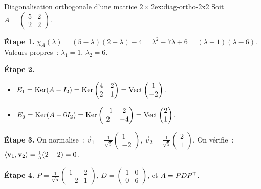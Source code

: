 \begin{example}{Diagonalisation orthogonale d'une matrice $2 \times 2$}{ex:diag-ortho-2x2}
  Soit $A = \begin{pmatrix} 5 & 2 \\ 2 & 2 \end{pmatrix}$.

  \textbf{Étape 1.} $\chi_A(\lambda) = (5-\lambda)(2-\lambda) - 4
  = \lambda^2 - 7\lambda + 6 = (\lambda - 1)(\lambda - 6)$.
  Valeurs propres~: $\lambda_1 = 1$, $\lambda_2 = 6$.

  \textbf{Étape 2.}
  \begin{itemize}
    \item $E_1 = \operatorname{Ker}(A - I_2) = \operatorname{Ker}\begin{pmatrix} 4 & 2 \\ 2 & 1
      \end{pmatrix} = \operatorname{Vect}\begin{pmatrix} 1 \\ -2 \end{pmatrix}$.
    \item $E_6 = \operatorname{Ker}(A - 6I_2) = \operatorname{Ker}\begin{pmatrix} -1 & 2 \\ 2 & -4
      \end{pmatrix} = \operatorname{Vect}\begin{pmatrix} 2 \\ 1 \end{pmatrix}$.
  \end{itemize}

  \textbf{Étape 3.} On normalise~:
  $\vec{v}_1 = \frac{1}{\sqrt{5}}\begin{pmatrix} 1 \\ -2 \end{pmatrix}$,
  $\vec{v}_2 = \frac{1}{\sqrt{5}}\begin{pmatrix} 2 \\ 1 \end{pmatrix}$.
  On vérifie~: $\langle\mathbf{v}_1, \mathbf{v}_2\rangle = \frac{1}{5}(2-2) = 0$.

  \textbf{Étape 4.}
  $P = \frac{1}{\sqrt{5}}\begin{pmatrix} 1 & 2 \\ -2 & 1 \end{pmatrix}$,
  $D = \begin{pmatrix} 1 & 0 \\ 0 & 6 \end{pmatrix}$, et
  $A = P D {P}^{\mathsf{T}}$.
\end{example}

